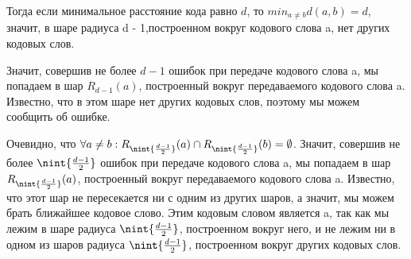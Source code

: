 \documentclass{article}
\DeclarePairedDelimiter{\nint}\lfloor\rfloor
\begin{document}
	  Тогда если минимальное расстояние кода равно $d$, то $min_{a \neq b} d(a, b) = d$, значит, в шаре радиуса d - 1,построенном вокруг кодового слова a, нет других кодовых слов. 
	  
	  Значит, совершив не более $d - 1$ ошибок при передаче кодового слова a, мы попадаем в шар $R_{d - 1}(a)$, построенный вокруг передаваемого кодового слова a. Известно, что в этом шаре нет других кодовых слов, поэтому мы можем сообщить об ошибке.
	  
	  Очевидно, что $\forall a \neq b: R_{\nint{\frac{d - 1}{2}}}(a) \cap R_{\nint{\frac{d - 1}{2}}}(b) = \emptyset$. Значит, совершив не более $\nint{\frac{d - 1}{2}}$ ошибок при передаче кодового слова a, мы попадаем в шар $R_{\nint{\frac{d - 1}{2}}}(a)$, построенный вокруг передаваемого кодового слова a. Известно, что этот шар не пересекается ни с одним из других шаров, а значит, мы можем брать ближайшее кодовое слово. Этим кодовым словом является a, так как мы лежим в шаре радиуса $\nint{\frac{d - 1}{2}}$, построенном вокруг него, и не лежим ни в одном из шаров радиуса $\nint{\frac{d - 1}{2}}$, построенном вокруг других кодовых слов. 
\end{document}
